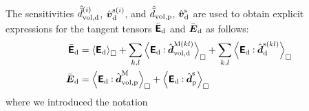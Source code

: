 \documentclass[10pt,a4paper]{article}
\newcommand{\NDIM}{n_\mathrm{dim}}
\newcommand{\ded}{\mathrm{d}}
\newcommand{\dep}{\mathrm{p}}
\begin{document}
%
The sensitivities $\hat{\bar{d}}^{(i)}_{\vol,\ded}$, $\hat{\ta{v}}^{\fluct(i)}_\ded$, and $\hat{\bar{d}}_{\vol,\dep}$, $\hat{\ta{v}}^{\fluct}_\ded$ are used to obtain explicit expressions for the tangent tensors
$\bar{\tf E}_\ded$ and $\bar{\ts E}_\ded$ as follows:
\begin{align}
    \bar{\tf E}_\ded
    & = 
    \left\langle \tf{E}_\ded \right\rangle_\Box +
    \sum_{k,l} \left\langle \tf{E}_\ded \dprod \hat{\ts{d}}^{\macro(kl)}_{\vol,\ded}\right\rangle_\Box +
    \sum_{k,l} \left\langle \tf{E}_\ded \dprod \hat{\ts{d}}^{\fluct(kl)}_\ded\right\rangle_\Box
\label{eq224a} \\
    \bar{\ts E}_\ded
    & = 
    \left\langle \tf{E}_\ded \dprod \hat{\ts{d}}^{\macro}_{\vol,\dep}\right\rangle_\Box +
    \left\langle \tf{E}_\ded \dprod \hat{\ts{d}}^{\fluct}_\dep\right\rangle_\Box
\label{eq224b}
\end{align}
where we introduced the notation
\end{document}

